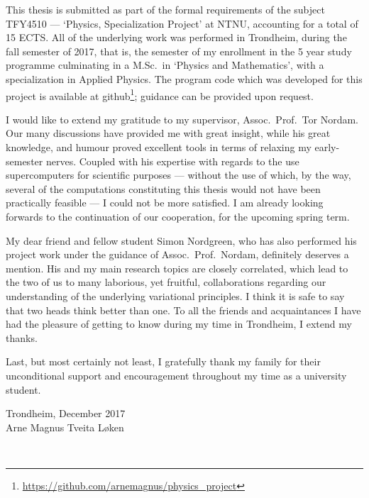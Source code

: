 This thesis is submitted as part of the formal requirements of the subject
TFY4510 --- `Physics, Specialization Project' at NTNU, accounting for a total
of 15 ECTS. All of the underlying work was performed in Trondheim, during the
fall semester of 2017, that is, the  semester of my enrollment in the
5 year study programme culminating in a M.Sc.\ in `Physics and Mathematics',
with a specialization in Applied Physics. The program code which was developed
for this project is available at
github\footnote{\url{https://github.com/arnemagnus/physics_project}}; guidance
can be provided upon request.
%

I would like to extend my gratitude to my supervisor, Assoc.\ Prof.\
Tor Nordam. Our many discussions have provided me with great insight, while
his great knowledge, and humour proved excellent tools in terms
of relaxing my early-semester nerves.
Coupled with his expertise with regards to the use supercomputers for scientific
purposes --- without the use of which, by the
way, several of the computations constituting this thesis would not have been
practically feasible --- I could not be more satisfied. I am already looking
forwards to the continuation of our cooperation, for the upcoming spring term.

My dear friend and fellow student Simon Nordgreen, who has also performed his
project work under the guidance of Assoc.\ Prof.\ Nordam, definitely
deserves a mention. His and my main research topics are closely correlated,
which lead to the two of us to many laborious, yet fruitful, collaborations
regarding our understanding of the underlying variational principles. I think it
is safe to say that two heads think better than one. To all the friends and
acquaintances I have had the pleasure of getting to know during my
time in Trondheim, I extend my thanks.

Last, but most certainly not least, I gratefully thank my family for their
unconditional support and encouragement throughout my time as a university
student.


\begin{minipage}[t]{\textwidth}
    \begin{flushright}
    Trondheim, December 2017\\
    Arne Magnus Tveita Løken
    \end{flushright}
\end{minipage}\\[2cm]
